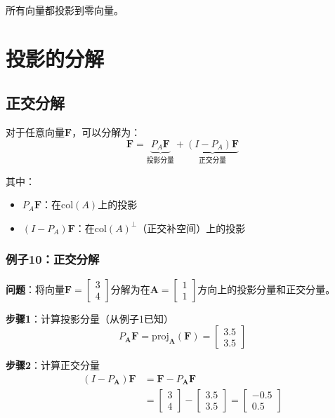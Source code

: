 \documentclass[12pt,a4paper]{article}
\begin{document}
所有向量都投影到零向量。

\section{投影的分解}

\subsection{正交分解}

对于任意向量$\bm{F}$，可以分解为：
\begin{equation}
\bm{F} = \underbrace{P_A \bm{F}}_{\text{投影分量}} + \underbrace{(I - P_A) \bm{F}}_{\text{正交分量}}
\label{eq:orthogonal_decomposition}
\end{equation}

其中：
\begin{itemize}
\item $P_A \bm{F}$：在$\text{col}(A)$上的投影
\item $(I - P_A) \bm{F}$：在$\text{col}(A)^\perp$（正交补空间）上的投影
\end{itemize}

\subsubsection{例子10：正交分解}

\textbf{问题}：将向量$\bm{F} = \begin{bmatrix} 3 \\ 4 \end{bmatrix}$分解为在$\bm{A} = \begin{bmatrix} 1 \\ 1 \end{bmatrix}$方向上的投影分量和正交分量。

\textbf{步骤1}：计算投影分量（从例子1已知）
\begin{equation}
P_{\bm{A}} \bm{F} = \text{proj}_{\bm{A}}(\bm{F}) = \begin{bmatrix} 3.5 \\ 3.5 \end{bmatrix}
\end{equation}

\textbf{步骤2}：计算正交分量
\begin{align}
(I - P_{\bm{A}}) \bm{F} &= \bm{F} - P_{\bm{A}} \bm{F} \\
&= \begin{bmatrix} 3 \\ 4 \end{bmatrix} - \begin{bmatrix} 3.5 \\ 3.5 \end{bmatrix} = \begin{bmatrix} -0.5 \\ 0.5 \end{bmatrix}
\end{align}
\end{document}
